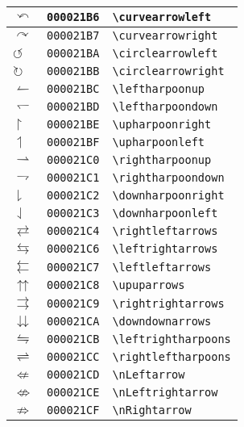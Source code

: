 \begin{longtable}{|l|l|l|}
\hline
$\curvearrowleft$ & \texttt{000021B6} & \verb|\curvearrowleft| \\
\hline
$\curvearrowright$ & \texttt{000021B7} & \verb|\curvearrowright| \\
\hline
$\circlearrowleft$ & \texttt{000021BA} & \verb|\circlearrowleft| \\
\hline
$\circlearrowright$ & \texttt{000021BB} & \verb|\circlearrowright| \\
\hline
$\leftharpoonup$ & \texttt{000021BC} & \verb|\leftharpoonup| \\
\hline
$\leftharpoondown$ & \texttt{000021BD} & \verb|\leftharpoondown| \\
\hline
$\upharpoonright$ & \texttt{000021BE} & \verb|\upharpoonright| \\
\hline
$\upharpoonleft$ & \texttt{000021BF} & \verb|\upharpoonleft| \\
\hline
$\rightharpoonup$ & \texttt{000021C0} & \verb|\rightharpoonup| \\
\hline
$\rightharpoondown$ & \texttt{000021C1} & \verb|\rightharpoondown| \\
\hline
$\downharpoonright$ & \texttt{000021C2} & \verb|\downharpoonright| \\
\hline
$\downharpoonleft$ & \texttt{000021C3} & \verb|\downharpoonleft| \\
\hline
$\rightleftarrows$ & \texttt{000021C4} & \verb|\rightleftarrows| \\
\hline
$\leftrightarrows$ & \texttt{000021C6} & \verb|\leftrightarrows| \\
\hline
$\leftleftarrows$ & \texttt{000021C7} & \verb|\leftleftarrows| \\
\hline
$\upuparrows$ & \texttt{000021C8} & \verb|\upuparrows| \\
\hline
$\rightrightarrows$ & \texttt{000021C9} & \verb|\rightrightarrows| \\
\hline
$\downdownarrows$ & \texttt{000021CA} & \verb|\downdownarrows| \\
\hline
$\leftrightharpoons$ & \texttt{000021CB} & \verb|\leftrightharpoons| \\
\hline
$\rightleftharpoons$ & \texttt{000021CC} & \verb|\rightleftharpoons| \\
\hline
$\nLeftarrow$ & \texttt{000021CD} & \verb|\nLeftarrow| \\
\hline
$\nLeftrightarrow$ & \texttt{000021CE} & \verb|\nLeftrightarrow| \\
\hline
$\nRightarrow$ & \texttt{000021CF} & \verb|\nRightarrow| \\

\end{longtable}
